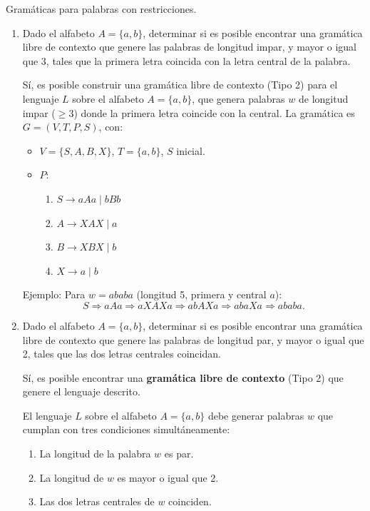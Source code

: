 \documentclass[12pt]{report} %
\begin{document}
\begin{ejercicio}
Gramáticas para palabras con restricciones.

\begin{enumerate}[label=\alph*)]
    \item Dado el alfabeto $A = \{a, b\}$, determinar si es posible encontrar una gramática libre de contexto que genere las palabras de longitud impar, y mayor o igual que 3, tales que la primera letra coincida con la letra central de la palabra.

    \begin{solucion}[a)]
    Sí, es posible construir una gramática libre de contexto (Tipo 2) para el lenguaje \( L \) sobre el alfabeto \( A = \{a, b\} \), que genera palabras \( w \) de longitud impar (\( \geq 3 \)) donde la primera letra coincide con la central. La gramática es \( G = (V, T, P, S) \), con:

    \begin{itemize}
        \item \( V = \{S, A, B, X\} \), \( T = \{a, b\} \), \( S \) inicial.
        \item \( P \):
        \begin{enumerate}
            \item \( S \to aAa \mid bBb \)
            \item \( A \to XAX \mid a \)
            \item \( B \to XBX \mid b \)
            \item \( X \to a \mid b \)
        \end{enumerate}
    \end{itemize}

    Ejemplo: Para \( w = ababa \) (longitud 5, primera y central \( a \)):
    \[
    S \Rightarrow aAa \Rightarrow aXAXa \Rightarrow abAXa \Rightarrow abaXa \Rightarrow ababa.
    \]
    \end{solucion}

    \item Dado el alfabeto $A = \{a, b\}$, determinar si es posible encontrar una gramática libre de contexto que genere las palabras de longitud par, y mayor o igual que 2, tales que las dos letras centrales coincidan.

    \begin{solucion}
    Sí, es posible encontrar una \textbf{gramática libre de contexto} (Tipo 2) que genere el lenguaje descrito.

    El lenguaje \( L \) sobre el alfabeto \( A = \{a, b\} \) debe generar palabras \( w \) que cumplan con tres condiciones simultáneamente:
    \begin{enumerate}
        \item La longitud de la palabra \( w \) es par.
        \item La longitud de \( w \) es mayor o igual que 2.
        \item Las dos letras centrales de \( w \) coinciden.
    \end{enumerate}


\end{solucion}
\end{enumerate}
\end{ejercicio}
\end{document}
